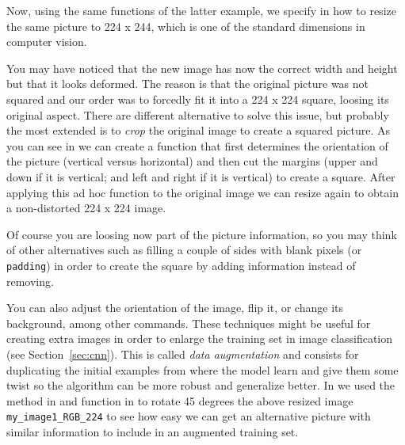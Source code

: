 
Now, using the same functions of the latter example, we specify in  how to resize the same picture to 224 x 244, which is one of the standard dimensions in computer vision. 


You may have noticed that the new image has now the correct width and height but that it looks deformed. The reason is that the original picture was not squared and our order was to forcedly fit it into a 224 x 224 square, loosing its original aspect. There are different alternative to solve this issue, but probably the most extended is to \textit{crop} the original image to create a squared picture. As you can see in  we can create a function that first determines the orientation of the picture (vertical versus horizontal) and then cut the margins (upper and down if it is vertical; and left and right if it is vertical) to create a square. After applying this ad hoc function  to the original image we can resize again to obtain a non-distorted 224 x 224 image.

Of course you are loosing now part of the picture information, so you may think of other alternatives such as filling a couple of sides with blank pixels (or \texttt{padding}) in order to create the square by adding information instead of removing.


You can also adjust the orientation of the image, flip it, or change its background, among other commands. These techniques might be useful for creating extra images in order to enlarge the training set in image classification (see Section~\ref{sec:cnn}). This is called \textit{data augmentation} and consists for duplicating the initial examples from where the model learn and give them some twist so the algorithm can be more robust and generalize better. In  we used the  method in  and  function in  to rotate 45 degrees the above resized image \texttt{my\_image1\_RGB\_224} to see how easy we can get an alternative picture with similar information to include in an augmented training set.

